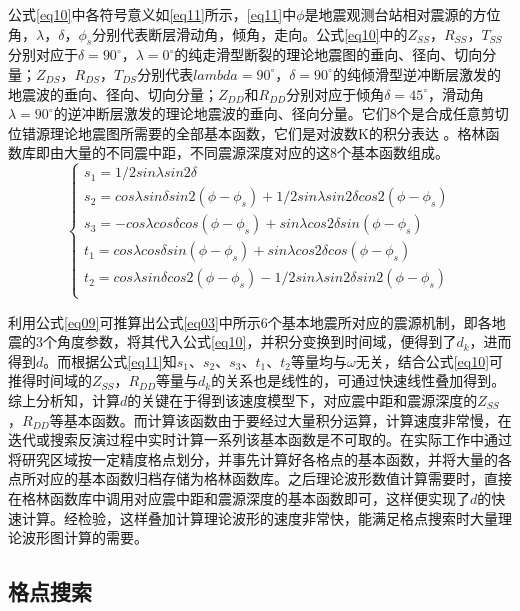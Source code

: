 公式\ref{eq10}中各符号意义如\ref{eq11}所示，\ref{eq11}中$\phi$是地震观测台站相对震源的方位角，$\lambda$，$\delta$，${\phi}_s$分别代表断层滑动角，倾角，走向。公式\ref{eq10}中的$Z_{SS}$，$R_{SS}$，$T_{SS}$分别对应于$\delta=90^\circ$，$\lambda=0^\circ$的纯走滑型断裂的理论地震图的垂向、径向、切向分量；$Z_{DS}$，$R_{DS}$，$T_{DS}$分别代表$lambda=90^\circ$，$\delta=90^\circ$的纯倾滑型逆冲断层激发的地震波的垂向、径向、切向分量；$Z_{DD}$和$R_{DD}$分别对应于倾角$\delta=45^\circ$，滑动角$\lambda=90^\circ$的逆冲断层激发的理论地震波的垂向、径向分量。它们8个是合成任意剪切位错源理论地震图所需要的全部基本函数，它们是对波数K的积分表达\citep{Wang1980} 。格林函数库即由大量的不同震中距，不同震源深度对应的这8个基本函数组成。
\begin{equation}
\label{eq11}
\left\{
    \begin{array}{l}
    s_1=1/2{sin\lambda}sin{2\delta}\\
    s_2={cos\lambda}{sin\delta}sin2({\phi}-{\phi}_s)+1/2{sin\lambda}{sin2\delta}cos2({\phi}-{\phi}_s)\\
    s_3=-{cos\lambda}{cos\delta}cos({\phi}-{\phi}_s)+{sin\lambda}{cos2\delta}sin({\phi}-{\phi}_s)\\
    t_1={cos\lambda}{cos\delta}sin({\phi}-{\phi}_s)+{sin\lambda}{cos2\delta}cos({\phi}-{\phi}_s)\\
    t_2={cos\lambda}{sin\delta}cos2({\phi}-{\phi}_s)-1/2{sin\lambda}{sin2\delta}sin2({\phi}-{\phi}_s)\\
    \end{array}
\right.
\end{equation}

利用公式\ref{eq09}可推算出公式\ref{eq03}中所示6个基本地震所对应的震源机制，即各地震的3个角度参数，将其代入公式\ref{eq10}，并积分变换到时间域，便得到了$d_k$，进而得到$d$。而根据公式\ref{eq11}知$s_1$、$s_2$、$s_3$、$t_1$、$t_2$等量均与$\omega$无关，结合公式\ref{eq10}可推得时间域的$Z_{SS}$，$R_{DD}$等量与$d_k$的关系也是线性的，可通过快速线性叠加得到。
综上分析知，计算$d$的关键在于得到该速度模型下，对应震中距和震源深度的$Z_{SS}$，$R_{DD}$等基本函数。而计算该函数由于要经过大量积分运算，计算速度非常慢，在迭代或搜索反演过程中实时计算一系列该基本函数是不可取的。在实际工作中通过将研究区域按一定精度格点划分，并事先计算好各格点的基本函数，并将大量的各点所对应的基本函数归档存储为格林函数库。之后理论波形数值计算需要时，直接在格林函数库中调用对应震中距和震源深度的基本函数即可，这样便实现了$d$的快速计算。经检验，这样叠加计算理论波形的速度非常快，能满足格点搜索时大量理论波形图计算的需要。

\subsection{格点搜索}

